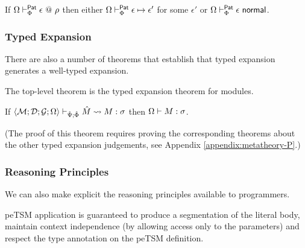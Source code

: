 \begingroup
\def\thetheorem{\ref{thm:ppTSM-progress}}
\begin{theorem}
If $\Omega \vdash_{\Phi}^{\mathsf{Pat}} \epsilon ~@~ \rho$ then either $\Omega \vdash_{\Phi}^\mathsf{Pat} \epsilon \mapsto \epsilon'$ for some $\epsilon'$ or $\Omega \vdash_{\Phi}^\mathsf{Pat} \epsilon~\mathsf{normal}$.
\end{theorem}
\endgroup

\subsubsection{Typed Expansion}
There are also a number of theorems that establish that typed expansion generates a well-typed expansion.

The top-level theorem is the typed expansion theorem for modules. 

\begingroup
\def\thetheorem{\ref{thm:module-expansion-P}}
\begin{theorem}
If $\langle \mathcal{M}; \mathcal{D}; \mathcal{G}; \Omega \rangle \vdash_{\hat{\Psi}; \hat\Phi} {\hat M} \leadsto M : \sigma$ then $\Omega \vdash M : \sigma$.
\end{theorem}
\endgroup

(The proof of this theorem requires proving the corresponding theorems about the other typed expansion judgements, see Appendix \ref{appendix:metatheory-P}.)

\subsubsection{Reasoning Principles}
We can also make explicit the reasoning principles available to programmers.

peTSM application is guaranteed to produce a segmentation of the literal body, maintain context independence (by allowing access only to the parameters) and respect the type annotation on the peTSM definition.

